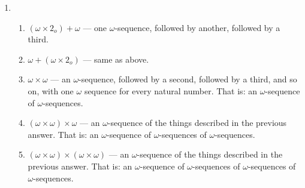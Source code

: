 \documentclass[12pt,a4paper]{article}
\begin{document}
\begin{enumerate}
\item  \begin{enumerate}
	\item $(\omega\times 2_o)+\omega$ --- one $\omega$-sequence, followed by another, followed by a third.
	\item $\omega+(\omega\times 2_o)$ --- same as above.
	\item $\omega\times\omega$ --- an $\omega$-sequence, followed by a second, followed by a third, and so on, with one $\omega$ sequence for every natural number. That is: an $\omega$-sequence of $\omega$-sequences.
	\item $(\omega\times\omega)\times\omega$ --- an $\omega$-sequence of the things described in the previous answer. That is: an $\omega$-sequence of $\omega$-sequences of $\omega$-sequences.
	\item $(\omega\times\omega)\times(\omega\times\omega)$ --- an $\omega$-sequence of the things described in the previous answer. That is: an $\omega$-sequence of $\omega$-sequences of $\omega$-sequences of $\omega$-sequences.
	\end{enumerate}

\end{enumerate}
\end{document}
